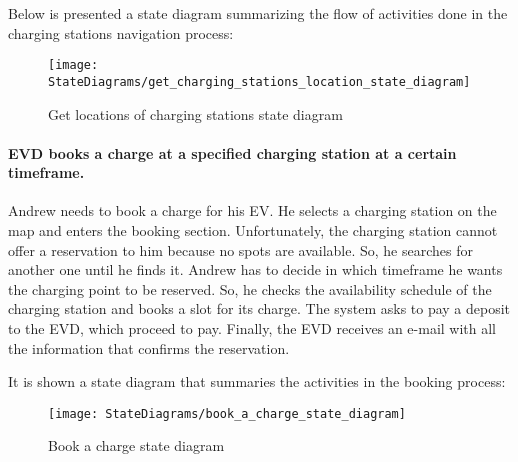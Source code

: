 Below is presented a state diagram summarizing the flow of activities done in the charging stations navigation process:
\begin{figure}[H]
    \begin{center}
        \texttt{[image: StateDiagrams/get\_charging\_stations\_location\_state\_diagram]}
        \caption{Get locations of charging stations state diagram}
        \label{fig:locations_sd}%
    \end{center}
\end{figure}

\paragraph{EVD books a charge at a specified charging station at a certain timeframe.}
Andrew needs to book a charge for his EV\@.
He selects a charging station on the map and enters the booking section.
Unfortunately, the charging station cannot offer a reservation to him because no spots are available.
So, he searches for another one until he finds it.
Andrew has to decide in which timeframe he wants the charging point to be reserved.
So, he checks the availability schedule of the charging station and books a slot for its charge.
The system asks to pay a deposit to the EVD, which proceed to pay.
Finally, the EVD receives an e-mail with all the information that confirms the reservation.

It is shown a state diagram that summaries the activities in the booking process:
\begin{figure}[H]
    \begin{center}
        \texttt{[image: StateDiagrams/book\_a\_charge\_state\_diagram]}
        \caption{Book a charge state diagram}
        \label{fig:booking_sd}%
    \end{center}
\end{figure}

